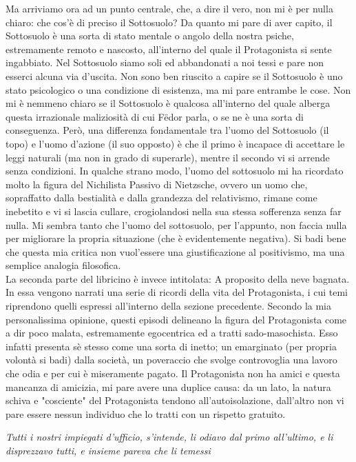 \documentclass[12pt,a4paper]{report}
\theoremstyle{definition}
\theoremstyle{Theorem}
\theoremstyle{definition}
\theoremstyle{definition}
\theoremstyle{definition}
\begin{document}
Ma arriviamo ora ad un punto centrale, che, a dire il vero, non mi è per nulla chiaro: che cos'è di preciso il Sottosuolo? Da quanto mi pare di aver capito, il Sottosuolo è una sorta di stato mentale o angolo della nostra psiche, estremamente remoto e nascosto, all'interno del quale il Protagonista si sente ingabbiato. Nel Sottosuolo siamo soli ed abbandonati a noi tessi e pare non esserci alcuna via d'uscita. Non sono ben riuscito a capire se il Sottosuolo è uno stato psicologico o una condizione di esistenza, ma mi pare entrambe le cose. Non mi è nemmeno chiaro se il Sottosuolo è qualcosa all'interno del quale alberga questa irrazionale maliziosità di cui Fëdor parla, o se ne è una sorta di conseguenza. Però, una differenza fondamentale tra l'uomo del Sottosuolo (il topo) e l'uomo d'azione (il suo opposto) è che il primo è incapace di accettare le leggi naturali (ma non in grado di superarle), mentre il secondo vi si arrende senza condizioni. In qualche strano modo, l'uomo del sottosuolo mi ha ricordato molto la figura del Nichilista Passivo di Nietzsche, ovvero un uomo che, sopraffatto dalla bestialità e dalla grandezza del relativismo, rimane come inebetito e vi si lascia cullare, crogiolandosi nella sua stessa sofferenza senza far nulla. Mi sembra tanto che l'uomo del sottosuolo, per l'appunto, non faccia nulla per migliorare la propria situazione (che è evidentemente negativa). Si badi bene che questa mia critica non vuol'essere una giustificazione al positivismo, ma una semplice analogia filosofica.\\
La seconda parte del libricino è invece intitolata: A proposito della neve bagnata. In essa vengono narrati una serie di ricordi della vita del Protagonista, i cui temi riprendono quelli espressi all'interno della sezione precedente. Secondo la mia personalissima opinione, questi episodi delineano la figura del Protagonista come a dir poco malata, estremamente egocentrica ed a tratti sado-masochista. Esso infatti presenta sè stesso come una sorta di inetto; un emarginato (per propria volontà si badi) dalla società, un poveraccio che svolge controvoglia una lavoro che odia e per cui è miseramente pagato. Il Protagonista non ha amici e questa mancanza di amicizia, mi pare avere una duplice causa: da un lato, la natura schiva e "cosciente" del Protagonista tendono all'autoisolazione, dall'altro non vi pare essere nessun individuo che lo tratti con un rispetto gratuito. 
\begin{center}
	\textit{Tutti i nostri impiegati d'ufficio, s'intende, li odiavo dal primo all'ultimo, e li disprezzavo tutti, e insieme pareva che li temessi}
\end{center}
\end{document}
